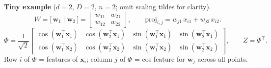 \documentclass[11pt]{article}
\newcommand{\Ph}{\Phi}
\newcommand{\Zmat}{Z}
\begin{document}
\begin{samebox}
\textbf{Tiny example} ($d=2$, $D=2$, $n=2$; omit scaling tildes for clarity).
\[
  W = \bigl[\,\mathbf w_1 \;\big|\; \mathbf w_2\,\bigr]
  = \begin{bmatrix} w_{11} & w_{21} \\ w_{12} & w_{22} \end{bmatrix},
  \qquad
  \mathrm{proj}_{i,j} = w_{j1}\,x_{i1} + w_{j2}\,x_{i2}.
\]
\[
  \Ph
  = \frac{1}{\sqrt{2}}
  \begin{bmatrix}
    \cos(\mathbf w_1^{\top}\mathbf x_1) & \cos(\mathbf w_2^{\top}\mathbf x_1) &
    \sin(\mathbf w_1^{\top}\mathbf x_1) & \sin(\mathbf w_2^{\top}\mathbf x_1) \\[4pt]
    \cos(\mathbf w_1^{\top}\mathbf x_2) & \cos(\mathbf w_2^{\top}\mathbf x_2) &
    \sin(\mathbf w_1^{\top}\mathbf x_2) & \sin(\mathbf w_2^{\top}\mathbf x_2)
  \end{bmatrix},
  \qquad
  \Zmat = \Ph^{\top}.
\]
Row $i$ of $\Ph$ = features of $\mathbf x_i$; column $j$ of $\Ph$ = cos feature for $\mathbf w_j$ across all points.
\end{samebox}
\end{document}
